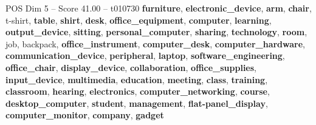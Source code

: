 \begin{textsample}{POS Dim 5 – Score 41.00 – t010730}  \label{ex:f5_pos_002}
\textbf{furniture}, \textbf{electronic\_device}, \textbf{arm}, \textbf{chair}, t-shirt, \textbf{table}, \textbf{shirt}, \textbf{desk}, \textbf{office\_equipment}, \textbf{computer}, \textbf{learning}, \textbf{output\_device}, \textbf{sitting}, \textbf{personal\_computer}, \textbf{sharing}, \textbf{technology}, \textbf{room}, job, backpack, \textbf{office\_instrument}, \textbf{computer\_desk}, \textbf{computer\_hardware}, \textbf{communication\_device}, \textbf{peripheral}, \textbf{laptop}, \textbf{software\_engineering}, \textbf{office\_chair}, \textbf{display\_device}, \textbf{collaboration}, \textbf{office\_supplies}, \textbf{input\_device}, \textbf{multimedia}, \textbf{education}, \textbf{meeting}, \textbf{class}, \textbf{training}, \textbf{classroom}, \textbf{hearing}, \textbf{electronics}, \textbf{computer\_networking}, \textbf{course}, \textbf{desktop\_computer}, \textbf{student}, \textbf{management}, \textbf{flat-panel\_display}, \textbf{computer\_monitor}, \textbf{company}, \textbf{gadget}

\end{textsample}
